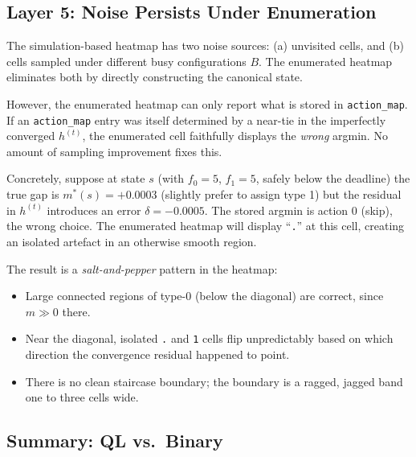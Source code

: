 \documentclass[11pt,a4paper]{article}
\begin{document}
\subsection{Layer 5: Noise Persists Under Enumeration}

The simulation-based heatmap has two noise sources: (a) unvisited cells, and
(b) cells sampled under different busy configurations $B$.  The enumerated
heatmap eliminates both by directly constructing the canonical state.

However, the enumerated heatmap can only report what is stored in
\texttt{action\_map}.  If an \texttt{action\_map} entry was itself determined
by a near-tie in the imperfectly converged $h^{(t)}$, the enumerated cell
faithfully displays the \emph{wrong} argmin.  No amount of sampling improvement
fixes this.

Concretely, suppose at state $s$ (with $f_0 = 5$, $f_1 = 5$, safely below the
deadline) the true gap is $m^*(s) = +0.0003$ (slightly prefer to assign type 1)
but the residual in $h^{(t)}$ introduces an error $\delta = -0.0005$.  The
stored argmin is action 0 (skip), the wrong choice.  The enumerated heatmap
will display ``\texttt{.}'' at this cell, creating an isolated artefact in an
otherwise smooth region.

The result is a \emph{salt-and-pepper} pattern in the heatmap:
\begin{itemize}
  \item Large connected regions of type-0 (below the diagonal) are correct,
        since $m \gg 0$ there.
  \item Near the diagonal, isolated \texttt{.} and \texttt{1} cells flip
        unpredictably based on which direction the convergence residual
        happened to point.
  \item There is no clean staircase boundary; the boundary is a ragged,
        jagged band one to three cells wide.
\end{itemize}

\subsection{Summary: QL vs.\ Binary}
\end{document}
